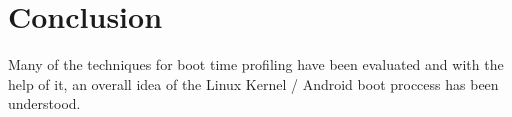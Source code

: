 

\section{Conclusion}
\label{conclusion}


\hspace{8mm} 

\noindent Many of the techniques for boot time profiling have been evaluated and with the
help of it, an overall idea of the Linux Kernel / Android boot proccess has been understood.

